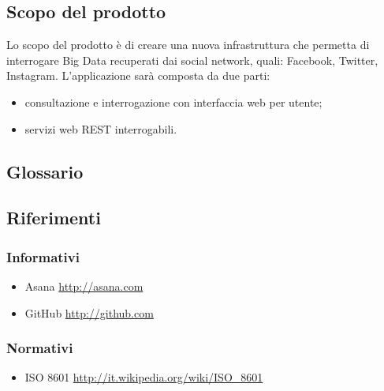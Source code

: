 \subsection{Scopo del prodotto}
Lo scopo del prodotto è di creare una nuova infrastruttura che permetta di interrogare Big Data recuperati dai social network, quali: Facebook, Twitter, Instagram.
L'applicazione sarà composta da due parti:
\begin{itemize}
\item consultazione e interrogazione con interfaccia web per utente;
\item servizi web REST interrogabili.
\end{itemize}





\subsection{Glossario}
\glossarioDesc


\subsection{Riferimenti}

\subsubsection{Informativi}
\begin{itemize}
\item Asana \url{http://asana.com}
\item GitHub \url{http://github.com}
\end{itemize}

\subsubsection{Normativi}
\begin{itemize}
\item ISO 8601 \url{http://it.wikipedia.org/wiki/ISO_8601}
\end{itemize}

